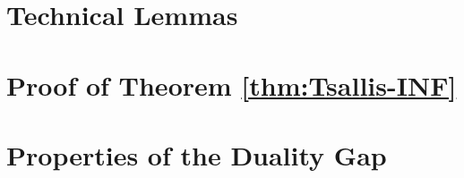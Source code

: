 \newpage
\appendix

\section{Technical Lemmas}\label{sec:app:lemmas}



\section{Proof of Theorem \ref{thm:Tsallis-INF}}\label{sec:app:proof-tsallis-inf}



\section{Properties of the Duality Gap}\label{sec:app:duality-gap}

